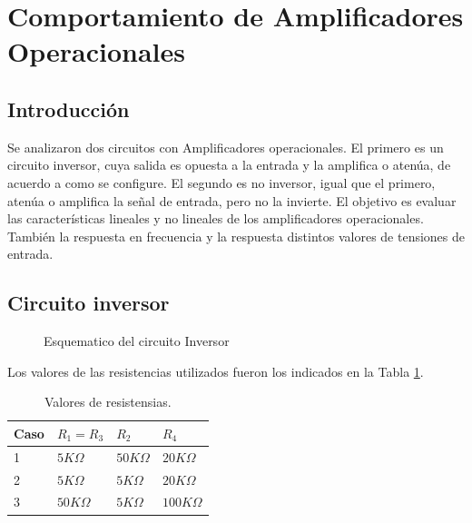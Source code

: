 \documentclass[../../main.tex]{subfiles}
\begin{document}
\section{Comportamiento de Amplificadores Operacionales}
\subsection{Introducci\'on}
Se analizaron dos circuitos con Amplificadores operacionales. El primero es un circuito inversor, cuya salida es opuesta a la entrada y la amplifica o atenúa, de acuerdo a como se configure. El segundo es no inversor, igual que el primero, atenúa o amplifica la señal de entrada, pero no la invierte.
El objetivo es evaluar las características lineales y no lineales de los amplificadores operacionales. También la respuesta en frecuencia y la respuesta distintos valores de tensiones de entrada.



\subsection{Circuito inversor}



\begin{figure}[H]
\centering



\caption{Esquematico del circuito Inversor}
\end{figure}

Los valores de las resistencias utilizados fueron los indicados en la Tabla \ref{tab=vResistencias}.

\begin{table}[h]
\begin{center}
\begin{tabular}{|l|l|l|l|}
\hline
Caso & $R_{1}=R_{3}$ & $R_{2}$ & $R_{4}$\\
\hline \hline
1 & $5 K\Omega $ &  $50 K\Omega $ &  $20 K\Omega $ \\ \hline
2 & $5 K\Omega $ &  $5 K\Omega $ &  $20 K\Omega $ \\ \hline
3 & $50 K\Omega $ &  $5 K\Omega $ &  $100 K\Omega $ \\ \hline
\end{tabular}
\caption{Valores de resistensias.} 
\label{tab=vResistencias}
\end{center}
\end{table}
\end{document}
